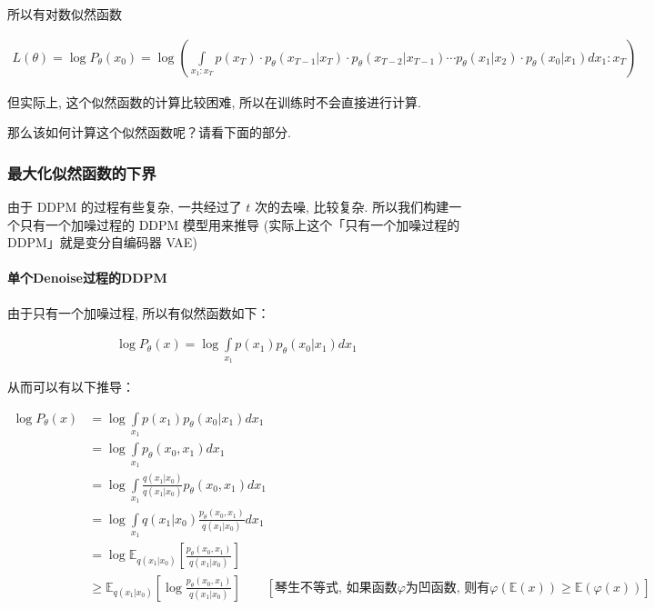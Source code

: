 所以有对数似然函数

\begin{equation}
\begin{aligned}
    L(\theta)=\log P_\theta(x_0)=\log\left(\int\limits_{x_1:x_T}p (x_T)\cdot p_\theta(x_{T-1}|x_T)\cdot p_\theta(x_{T-2}|x_{T-1})\cdots p_\theta(x_1|x_2)\cdot p_\theta (x_0|x_1)dx_1:x_T\right)
\end{aligned}
\end{equation}

但实际上, 这个似然函数的计算比较困难, 所以在训练时不会直接进行计算.

那么该如何计算这个似然函数呢？请看下面的部分.

\subsubsection{最大化似然函数的下界}

由于 DDPM 的过程有些复杂, 一共经过了 $t$ 次的去噪, 比较复杂. 所以我们构建一个只有一个加噪过程的 DDPM 模型用来推导 (实际上这个「只有一个加噪过程的 DDPM」就是变分自编码器 VAE)

\paragraph{单个Denoise过程的DDPM}

由于只有一个加噪过程, 所以有似然函数如下：

\begin{equation}
\begin{aligned}
    \log P_\theta(x)=\log\int\limits_{x_1}p(x_1)p_{\theta}(x_0|x_1)dx_1
\end{aligned}
\end{equation}



从而可以有以下推导：


\begin{equation}
\begin{aligned}
\log P_\theta(x)&=\log\int\limits_{x_1}p(x_1)p_{\theta}(x_0|x_1)dx_1\\
&=\log\int\limits_{x_1}p_\theta(x_0,{x_1})d{x_1}\\
&=\log\int\limits_{x_1}\frac{q(x_1|x_0)}{q({x_1}|x_0)}p_\theta(x_0,{x_1})d{x_1}\\
&=\log\int\limits_{x_1}q(x_1|x_0)\frac{p_\theta(x_0,x_1)}{q(x_1|x_0)}dx_1\\
&=\log \mathbb{E}_{q(x_1|x_0)}\left[\frac{p_\theta(x_0,x_1)}{q(x_1|x_0)}\right]\\
&\ge \mathbb{E}_{q(x_1|x_0)}\left[\log\frac{p_\theta(x_0,x_1)}{q(x_1|x_0)}\right]\quad\quad[\text{琴生不等式, 如果函数}\varphi\text{为凹函数, 则有}\varphi\left(\mathbb{E}(x)\right)\ge\mathbb{E}\left(\varphi(x)\right)]
\end{aligned}
\end{equation}


